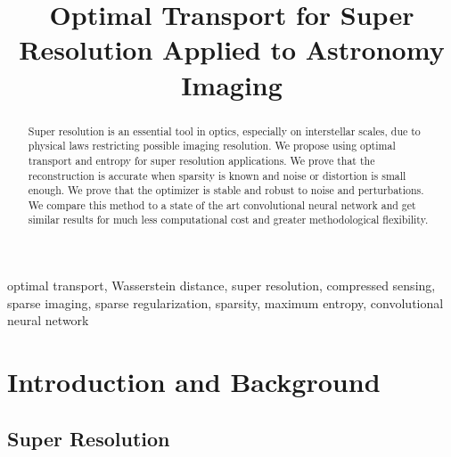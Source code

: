 \documentclass[conference]{IEEEtran}
\begin{document}

\title{Optimal Transport for Super Resolution Applied to Astronomy Imaging}

\author{
\and
{}
}

\maketitle

\begin{abstract}
Super resolution is an essential tool in optics, especially on interstellar scales, due to physical laws restricting possible imaging resolution. We propose using optimal transport and entropy for super resolution applications. We prove that the reconstruction is accurate when sparsity is known and noise or distortion is small enough. We prove that the optimizer is stable and robust to noise and perturbations. We compare this method to a state of the art convolutional neural network and get similar results for much less computational cost and greater methodological flexibility.  
\end{abstract}

\begin{IEEEkeywords}
optimal transport, Wasserstein distance, super resolution, compressed sensing, sparse imaging, sparse regularization, sparsity, maximum entropy, convolutional neural network
\end{IEEEkeywords}


\section{Introduction and Background}

\subsection{Super Resolution}
\end{document}
